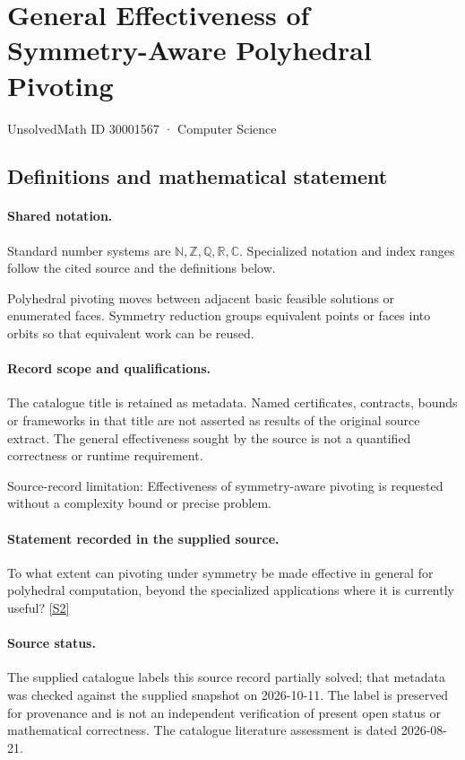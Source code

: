 \documentclass[11pt]{article}
\newcommand{\sref}[2]{\hyperlink{source:#1:#2}{[S#2]}}
\begin{document}
\setcounter{section}{30001566}
\section{General Effectiveness of Symmetry-Aware Polyhedral Pivoting}\label{30001567}
{\small\sffamily UnsolvedMath ID 30001567 · Computer Science}
\subsection{Definitions and mathematical statement}

\paragraph{Shared notation.}Standard number systems are $\mathbb N,\mathbb Z,\mathbb Q,\mathbb R,\mathbb C$. Specialized notation and index ranges follow the cited source and the definitions below.


Polyhedral pivoting moves between adjacent basic feasible solutions or enumerated faces. Symmetry reduction groups equivalent points or faces into orbits so that equivalent work can be reused.
\paragraph{Record scope and qualifications.}
The catalogue title is retained as metadata. Named certificates, contracts, bounds or frameworks in that title are not asserted as results of the original source extract.
The general effectiveness sought by the source is not a quantified correctness or runtime requirement.

Source-record limitation: Effectiveness of symmetry-aware pivoting is requested without a complexity bound or precise problem.
\paragraph{Statement recorded in the supplied source.}
To what extent can pivoting under symmetry be made effective in general for polyhedral computation, beyond the specialized applications where it is currently useful? \sref{30001567}{2}
\paragraph{Source status.}
The supplied catalogue labels this source record partially solved; that metadata was checked against the supplied snapshot on 2026-10-11. The label is preserved for provenance and is not an independent verification of present open status or mathematical correctness. The catalogue literature assessment is dated 2026-08-21.
\end{document}
